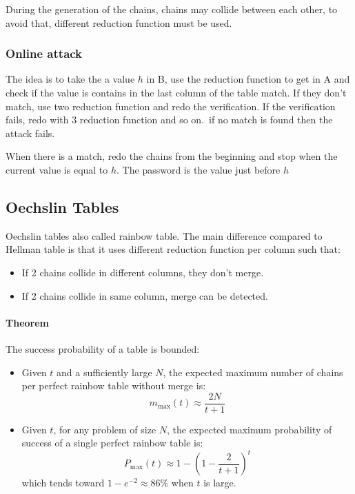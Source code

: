 During the generation of the chains, chains may collide between each other, to
avoid that, different reduction function must be used.
\subsubsection{Online attack}
The idea is to take the a value $h$ in B, use the reduction function to get in A
and check if the value is contains in the last column of the table match.
If they don't match, use two reduction function and redo the verification.
If the verification fails, redo with 3 reduction function and so on.\ if
no match is found then the attack fails.

When there is a match, redo the chains from the beginning and stop when the
current value is equal to $h$. The password is the value just before $h$

\subsection{Oechslin Tables}
Oechslin tables also called rainbow table. The main difference compared to
Hellman table is that it uses different reduction function per column such that:

\begin{itemize}
    \item If 2 chains collide in different columns, they don't merge.
    \item If 2 chains collide in same column, merge can be detected.
\end{itemize}

\paragraph{Theorem} The success probability of a table is bounded:
\begin{itemize}
    \item
    Given $t$ and a sufficiently large $N$, the expected maximum number of
    chains per perfect rainbow table without merge is:
    $$ m_{\max}(t)\approx\frac{2N}{t+1} $$
    \item
    Given $t$, for any problem of size $N$, the expected maximum probability of
    success of a single perfect rainbow table is:
    $$ P_{\max}(t)\approx 1 - (1-\frac{2}{t+1})^t $$
    which tends toward $ 1 - e^{-2}\approx 86\% $ when $t$ is large.

\end{itemize}

